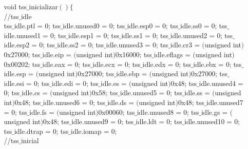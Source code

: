\begin{algorithmic}
\State \tab void tss$\_$inicializar$() \{$\\
  \State \tab \tab //tss$\_$idle\\

  \State \tab \tab tss$\_$idle.ptl = 0;
  \State \tab \tab tss$\_$idle.unused0 = 0;
  \State \tab \tab tss$\_$idle.esp0 = 0;
  \State \tab \tab tss$\_$idle.ss0 = 0;
  \State \tab \tab tss$\_$idle.unused1 = 0;
  \State \tab \tab tss$\_$idle.esp1 = 0;
  \State \tab \tab tss$\_$idle.ss1 = 0;
  \State \tab \tab tss$\_$idle.unused2 = 0;
  \State \tab \tab tss$\_$idle.esp2 = 0;
  \State \tab \tab tss$\_$idle.ss2 = 0;
  \State \tab \tab tss$\_$idle.unused3 = 0;
  \State \tab \tab tss$\_$idle.cr3 = $($unsigned int$)$0x27000;
  \State \tab \tab tss$\_$idle.eip = $($unsigned int$)$0x16000;
  \State \tab \tab tss$\_$idle.eflags = $($unsigned int$)$0x00202;
  \State \tab \tab tss$\_$idle.eax = 0;
  \State \tab \tab tss$\_$idle.ecx = 0;
  \State \tab \tab tss$\_$idle.edx = 0;
  \State \tab \tab tss$\_$idle.ebx = 0;
  \State \tab \tab tss$\_$idle.esp = $($unsigned int$)$0x27000;
  \State \tab \tab tss$\_$idle.ebp = $($unsigned int$)$0x27000;
  \State \tab \tab tss$\_$idle.esi = 0;
  \State \tab \tab tss$\_$idle.edi = 0;
  \State \tab \tab tss$\_$idle.es = $($unsigned int$)$0x48;
  \State \tab \tab tss$\_$idle.unused4 = 0;
  \State \tab \tab tss$\_$idle.cs = $($unsigned int$)$0x58;
  \State \tab \tab tss$\_$idle.unused5 = 0;
  \State \tab \tab tss$\_$idle.ss = $($unsigned int$)$0x48;
  \State \tab \tab tss$\_$idle.unused6 = 0;
  \State \tab \tab tss$\_$idle.ds = $($unsigned int$)$0x48;
  \State \tab \tab tss$\_$idle.unused7 = 0;
  \State \tab \tab tss$\_$idle.fs = $($unsigned int$)$0x00060;
  \State \tab \tab tss$\_$idle.unused8 = 0;
  \State \tab \tab tss$\_$idle.gs = $($unsigned int$)$0x48;
  \State \tab \tab tss$\_$idle.unused9 = 0;
  \State \tab \tab tss$\_$idle.ldt = 0;
  \State \tab \tab tss$\_$idle.unused10 = 0;
  \State \tab \tab tss$\_$idle.dtrap = 0;
  \State \tab \tab tss$\_$idle.iomap = 0;\\

  \State \tab \tab //tss$\_$inicial\\


\end{algorithmic}
